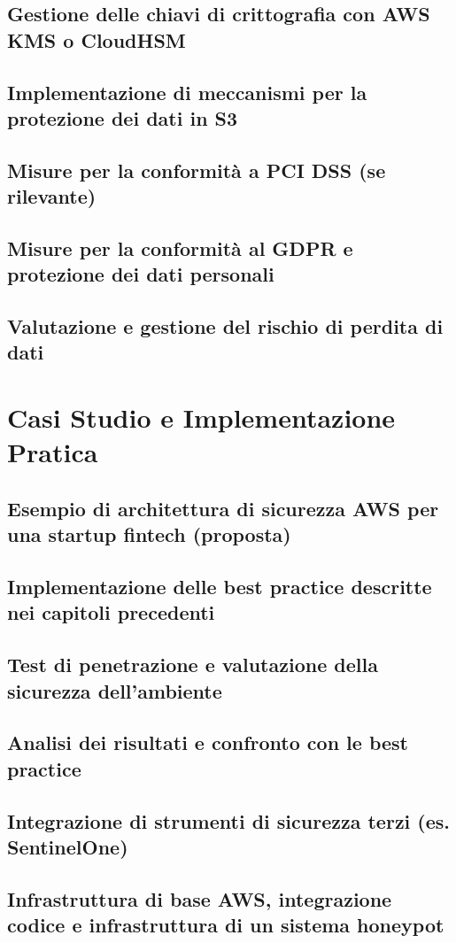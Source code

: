 \documentclass[a4paper,12pt]{report}
\begin{document}
\section{Gestione delle chiavi di crittografia con AWS KMS o CloudHSM}
\section{Implementazione di meccanismi per la protezione dei dati in S3}
\section{Misure per la conformità a PCI DSS (se rilevante)}
\section{Misure per la conformità al GDPR e protezione dei dati personali}
\section{Valutazione e gestione del rischio di perdita di dati}

\chapter{Casi Studio e Implementazione Pratica}
\section{Esempio di architettura di sicurezza AWS per una startup fintech (proposta)}
\section{Implementazione delle best practice descritte nei capitoli precedenti}
\section{Test di penetrazione e valutazione della sicurezza dell'ambiente}
\section{Analisi dei risultati e confronto con le best practice}
\section{Integrazione di strumenti di sicurezza terzi (es. SentinelOne)}
\section{Infrastruttura di base AWS, integrazione codice e infrastruttura di un sistema honeypot}
\end{document}
